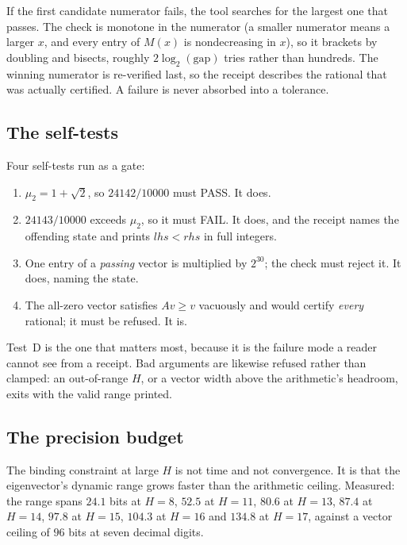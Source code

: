 \documentclass[11pt]{article}
\begin{document}
If the first candidate numerator fails, the tool searches for the largest one
that passes. The check is monotone in the numerator (a smaller numerator means
a larger $x$, and every entry of $M(x)$ is nondecreasing in $x$), so it brackets
by doubling and bisects, roughly $2\log_2(\text{gap})$ tries rather than
hundreds. The winning numerator is re-verified last, so the receipt describes the
rational that was actually certified. A failure is never absorbed into a
tolerance.

\subsection{The self-tests}
\label{sec:selftest}

Four self-tests run as a gate:

\begin{enumerate}
\item[\textbf{A}] $\mu_2 = 1+\sqrt2$, so $24142/10000$ must PASS. It does.
\item[\textbf{B}] $24143/10000$ exceeds $\mu_2$, so it must FAIL. It does, and
  the receipt names the offending state and prints $\mathit{lhs} < \mathit{rhs}$
  in full integers.
\item[\textbf{C}] One entry of a \emph{passing} vector is multiplied by $2^{30}$;
  the check must reject it. It does, naming the state.
\item[\textbf{D}] The all-zero vector satisfies $Av \ge v$ vacuously and would
  certify \emph{every} rational; it must be refused. It is.
\end{enumerate}

Test~D is the one that matters most, because it is the failure mode a reader
cannot see from a receipt. Bad arguments are likewise refused rather than
clamped: an out-of-range $H$, or a vector width above the arithmetic's headroom,
exits with the valid range printed.

\subsection{The precision budget}
\label{sec:precision}

The binding constraint at large $H$ is not time and not convergence. It is that
the eigenvector's dynamic range grows faster than the arithmetic ceiling.
Measured: the range spans $24.1$ bits at $H=8$, $52.5$ at $H=11$, $80.6$ at
$H=13$, $87.4$ at $H=14$, $97.8$ at $H=15$, $104.3$ at $H=16$ and $134.8$ at
$H=17$, against a vector ceiling of $96$ bits at seven decimal digits.
\end{document}
